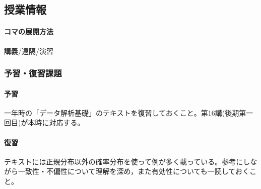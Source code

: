 \subsection{授業情報}
\paragraph{コマの展開方法}
講義/遠隔/演習
\subsubsection{予習・復習課題}
\paragraph{予習} 一年時の「データ解析基礎」のテキストを復習しておくこと。第16講(後期第一回目)が本時に対応する。
\paragraph{復習} テキストには正規分布以外の確率分布を使って例が多く載っている。参考にしながら一致性・不偏性について理解を深め，また有効性についても一読しておくこと。